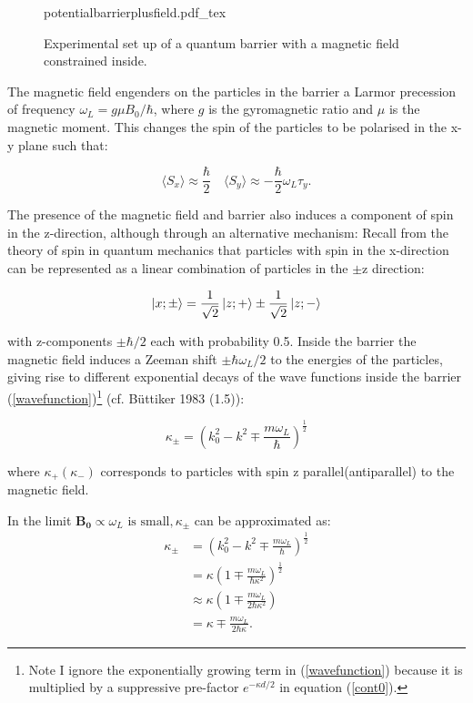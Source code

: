\documentclass{article}
\newcommand{\incfig}[1]{%
    \def\svgwidth{10cm}
    {#1.pdf_tex}
}
\begin{document}
\begin{figure}[ht]
    \centering
    \incfig{potentialbarrierplusfield}
    \caption{Experimental set up of a quantum barrier with a magnetic field constrained inside.}
    \label{fig:potentialbarrierfield}
\end{figure}

\noindent The magnetic field engenders on the particles in the barrier a Larmor precession of frequency $\omega_L = g\mu B_0/\hbar$, where $g$ is the gyromagnetic ratio and $\mu$ is the magnetic moment. This changes the spin of the particles to be polarised in the x-y plane such that:

\begin{equation}
	\langle S_x \rangle \approx \frac{\hbar}{2} \quad \langle S_y \rangle \approx -\frac{\hbar}{2}\omega_L\tau_y.
\end{equation}

\noindent The presence of the magnetic field and barrier also induces a component of spin in the z-direction, although through an alternative mechanism: Recall from the theory of spin in quantum mechanics that particles with spin in the x-direction can be represented as a linear combination of particles in the $\pm \text{z}$ direction:

\begin{equation}
	\ket{x; \pm} = \frac{1}{\sqrt{2}}\ket{z;+} \pm \frac{1}{\sqrt{2}}\ket{z;-}
\end{equation}

\noindent with z-components $\pm \hbar/2$ each with probability 0.5. Inside the barrier the magnetic field induces a Zeeman shift $\pm \hbar\omega_L/2$ to the energies of the particles, giving rise to different exponential decays of the wave functions inside the barrier (\ref{wavefunction})\footnote{Note I ignore the exponentially growing term in (\ref{wavefunction}) because it is multiplied by a suppressive pre-factor $e^{-\kappa d/2}$ in equation (\ref{cont0}).} (cf. B{\"u}ttiker 1983 (1.5)):

\begin{equation}
	\kappa_{\pm}=(k_0^2-k^2\mp \frac{m\omega_L}{\hbar})^{\frac{1}{2}}
\end{equation}

\noindent where $\kappa_{+}(\kappa_{-})$ corresponds to particles with spin z parallel(antiparallel) to the magnetic field.

\noindent In the limit $\boldsymbol{B_0} \propto \omega_L \text{ is small}, \kappa_{\pm}$ can be approximated as:
\begin{subequations}
\begin{align}
   \kappa_{\pm} &= \left(k^{2}_{0}-k^{2} \mp \frac{m \omega_{L}}{\hbar}\right)^{\frac{1}{2}}\\	
		&= \kappa \left(1 \mp \frac{m \omega_{L}}{\hbar \kappa^{2}}\right)^{\frac{1}{2}}\\
		&\approx \kappa \left(1 \mp \frac{m \omega_{L}}{2\hbar \kappa^{2}}\right)\\
		&= \kappa \mp \frac{m \omega_{L}}{2\hbar \kappa} \label{smallfieldkappa}.
\end{align}
\end{subequations}
\end{document}
